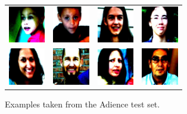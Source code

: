 \documentclass[journal]{IEEEtran}
\begin{document}
\begin{itemize}
		\begin{figure}[!t]
			\centering
			\begin{tabular}{cccc}
				\includegraphics[width=1.6cm]{img/adience/1.jpg} & \includegraphics[width=1.6cm]{img/adience/2.jpg} & \includegraphics[width=1.6cm]{img/adience/3.jpg} & \includegraphics[width=1.6cm]{img/adience/4.jpg}\\
				\includegraphics[width=1.6cm]{img/adience/5.jpg} & \includegraphics[width=1.6cm]{img/adience/6.jpg} & \includegraphics[width=1.6cm]{img/adience/7.jpg} & \includegraphics[width=1.6cm]{img/adience/8.jpg}
			\end{tabular}						
			\caption{Examples taken from the Adience test set.}
			\label{fig:AdienceExamples}
		\end{figure}
	\end{itemize}
	
\end{document}
